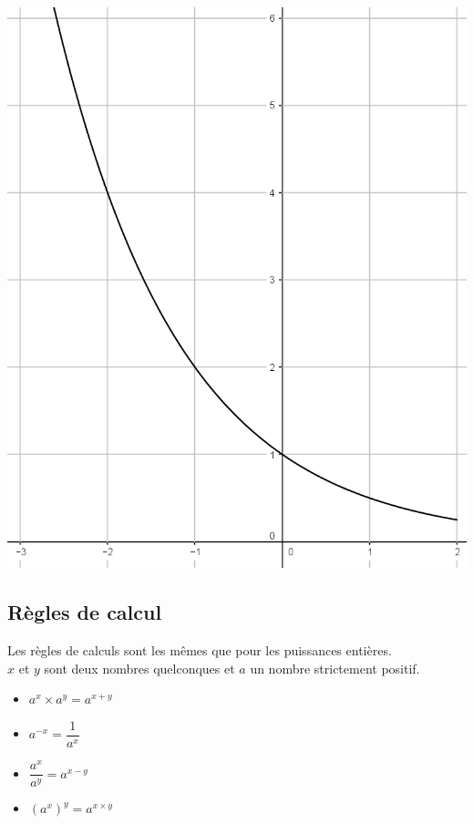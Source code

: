 \documentclass[12pt,a4paper]{article}
\begin{document}
\begin{myex}
\begin{multicols}{2}
		\begin{center}
			\includegraphics[scale=0.25]{./img/var2}
		\end{center}
	\end{multicols}
\end{myex}

\subsection{Règles de calcul}

\begin{myprops}
	Les règles de calculs sont les mêmes que pour les puissances entières.\\
	$x$ et $y$ sont deux nombres quelconques et $a$ un nombre strictement positif.
	
	\begin{multicols}{2}
		
		\begin{itemize}
			\item $a^x \times a^y = a^{x+y}$
			\item $a^{-x} = \dfrac{1}{a^x}$
			\item $\dfrac{a^x}{a^y} = a^{x-y}$
			\item $(a^x)^y = a^{x \times y}$
		\end{itemize}	
		
	\end{multicols}
\end{myprops}
\end{document}

